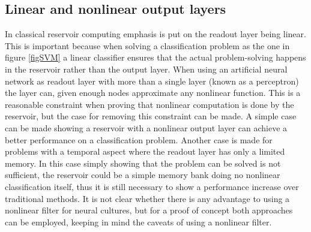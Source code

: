\subsection{Linear and nonlinear output layers}
In classical reservoir computing emphasis is put on the readout layer being
linear.
This is important because when solving a classification problem as the one in figure
\ref{figSVM} a linear classifier ensures that the actual problem-solving happens
in the reservoir rather than the output layer.
When using an artificial neural network as readout layer with more than a single
layer (known as a perceptron) the layer can, given enough nodes approximate any
nonlinear function.
This is a reasonable constraint when proving that nonlinear computation is done
by the reservoir, but the case for removing this constraint can be made.
A simple case can be made showing a reservoir with a nonlinear output layer can
achieve a better performance on a classification problem.
Another case is made for problems with a temporal aspect where the readout layer
has only a limited memory.
In this case simply showing that the problem can be solved is not sufficient,
the reservoir could be a simple memory bank doing no nonlinear classification
itself, thus it is still necessary to show a performance increase over
traditional methods.
It is not clear whether there is any advantage to using a nonlinear filter for
neural cultures, but for a proof of concept both approaches can be employed,
keeping in mind the caveats of using a nonlinear filter.
\cleardoublepage

